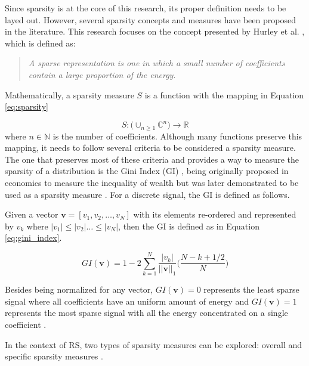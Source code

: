     Since sparsity is at the core of this research, its proper definition needs to be layed out. However, several sparsity concepts and measures have been proposed in the literature. This research focuses on the concept presented by Hurley et al. \cite{10.1109/TIT.2009.2027527}, which is defined as: 
    
    \begin{quote}
        \textit{A sparse representation is one in which a small number of coefficients contain a large proportion of the energy}.    
    \end{quote}
     
    Mathematically, a sparsity measure $S$ is a function with the mapping in Equation \ref{eq:sparsity}
     
    \begin{equation}
        \label{eq:sparsity}
        S: \bigg( \cup_{n \geq 1} \mathbb{C}^n \bigg) \rightarrow \mathbb{R}
    \end{equation} where $n \in \mathbb{N}$ is the number of coefficients. Although many functions preserve this mapping, it needs to follow several criteria to be considered a sparsity measure. The one that preserves most of these criteria and provides a way to measure the sparsity of a distribution is the Gini Index (GI)  \cite{10.2307/2223525}, being originally proposed in economics to measure the inequality of wealth but was later demonstrated to be used as a sparsity measure \cite{2006SparseSources, 2004GiniIndexSpeech}. For a discrete signal, the GI is defined as follows.
    
    Given a vector $\textbf{v} = [v_1, v_2, \ldots, v_N]$ with its elements re-ordered and represented by $v_k$ where $|v_1| \leq |v_2| \ldots \leq |v_N|$, then the GI is defined as in Equation \ref{eq:gini_index}.
     
    \begin{equation}
        \label{eq:gini_index}
        GI(\textbf{v}) = 1 - 2\sum_{k=1}^{N} \frac{|v_k|}{||\textbf{v}||_1} \bigg( \frac{N-k+1/2}{N} \bigg)
    \end{equation}
     
    Besides being normalized for any vector, $GI(\textbf{v}) = 0$ represents the least sparse signal where all coefficients have an uniform amount of energy and $GI(\textbf{v}) = 1$ represents the most sparse signal with all the energy concentrated on a single coefficient \cite{10.1109/TIT.2009.2027527}. 
     
    In the context of RS, two types of sparsity measures can be explored: overall and specific sparsity measures \cite{10.1016/j.eswa.2010.09.141}.
    
